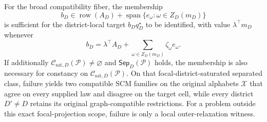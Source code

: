 For the broad compatibility fiber, the membership
\[
b_D\in\operatorname{row}(A_D)+\operatorname{span}\{e_\omega:\omega\in Z_D(m_D)\}
\]
is sufficient for the district-local target \(b_Dq_D^\star\) to be identified, with value \(\lambda^\top m_D\) whenever
\[
b_D=\lambda^\top A_D+\sum_{\omega\in Z_D(m_D)}\zeta_\omega e_\omega.
\]
If additionally \(\mathcal C_{\mathrm{sat},D}(\mathcal P)\ne\varnothing\) and \(\mathsf{Sep}_D(\mathcal P)\) holds, the membership is also necessary for constancy on \(\mathcal C_{\mathrm{sat},D}(\mathcal P)\). On that focal-district-saturated separated class, failure yields two compatible SCM families on the original alphabets \(\mathcal X\) that agree on every supplied law and disagree on the target cell, while every district \(D'\ne D\) retains its original graph-compatible restrictions. For a problem outside this exact focal-projection scope, failure is only a local outer-relaxation witness.